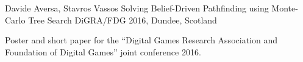 \begin{cventries}

\cventry
{Davide Aversa, Stavros Vassos} %
{Solving Belief-Driven Pathfinding using Monte-Carlo Tree Search} %
{DiGRA/FDG} %
{2016, Dundee, Scotland} %
{ %
\begin{cvitems}
	\item {Poster and short paper for the ``Digital Games Research Association and Foundation of Digital Games'' joint conference 2016.}
\end{cvitems}
}

\end{cventries}